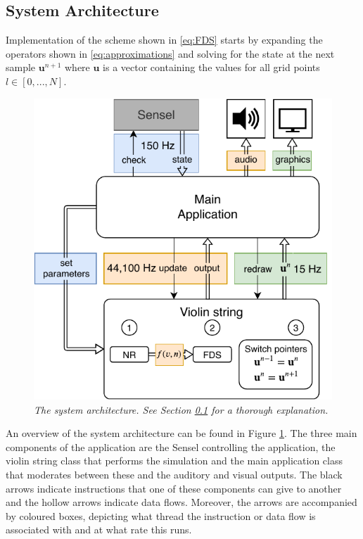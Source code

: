 \documentclass[twoside,a4paper,dvipsnames]{article}
\begin{document}
\subsection{System Architecture}\label{sec:systemArch}
Implementation of the scheme shown in \eqref{eq:FDS} starts by expanding the operators shown in \eqref{eq:approximations} and solving for the state at the next sample $\mathbf{u}^{n+1}$ where $\mathbf{u}$ is a vector containing the values for all grid points $l\in[0,...,N]$.

\begin{figure}[ht]
\centerline{\includegraphics[width=1.0\columnwidth]{systemArchitecture.pdf}}
\caption{\label{fig:systemArch}{\it The system architecture. See Section \ref{sec:systemArch} for a thorough explanation.}}
\end{figure}

An overview of the system architecture can be found in Figure \ref{fig:systemArch}. The three main components of the application are the Sensel controlling the application, the violin string class that performs the simulation and the main application class that moderates between these and the auditory and visual outputs. The black arrows indicate instructions that one of these components can give to another and the hollow arrows indicate data flows. Moreover, the arrows are accompanied by coloured boxes, depicting what thread the instruction or data flow is associated with and at what rate this runs. 
\end{document}

